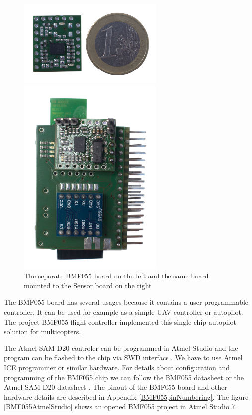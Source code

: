 \begin{figure}
	\centering
	\label{BMF055photo}
	\caption{The separate BMF055 board on the left and the same board mounted to the Sensor board on the right}
	\begin{minipage}[c]{.45\textwidth}
		\includegraphics[width=7cm]{img/BMF055.jpg}
	\end{minipage}
	\vrule{}
	\begin{minipage}[c]{.45\textwidth}
		\includegraphics[width=7cm]{img/HWassembledNoCoin.jpg}
	\end{minipage}
\end{figure}

The BMF055 board has several usages because it contains a user programmable controller. It can be used for example as a simple UAV controller or autopilot. The project BMF055-flight-controller \cite{BMF055flightController} implemented this single chip autopilot solution for multicopters.

The Atmel SAM D20 controler \cite{atmel:samd20} can be programmed in Atmel Studio \cite{AtmelStudio} and the program can be flashed to the chip via SWD interface \cite{SWDinterface}. We have to use Atmel ICE programmer \cite{AtmelICE} or similar hardware. For details about configuration and programming of the BMF055 chip we can follow the BMF055 datasheet \cite{bosch:BMF055} or the Atmel SAM D20 datasheet \cite{atmel:samd20}. The pinout of the BMF055 board and other hardware details are described in Appendix \ref{BMF055pinNumbering}. The figure \ref{BMF055AtmelStudio} shows an opened BMF055 project in Atmel Studio 7.

